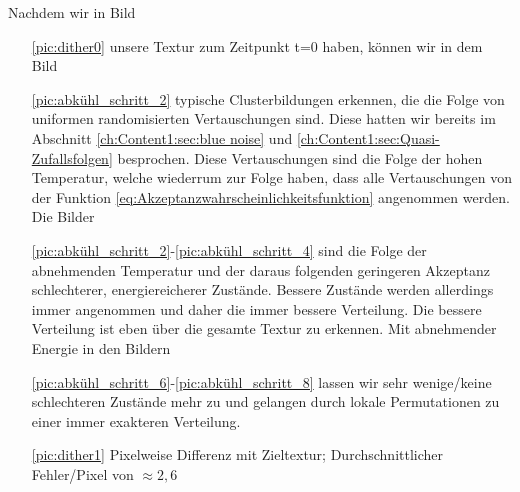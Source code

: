   Nachdem wir in Bild 
  \begin{itemize}
    \item[\ref{pic:dither0}] unsere  Textur zum Zeitpunkt t=0 
                              haben, können wir in dem Bild
    \item[\ref{pic:abkühl_schritt_2}] typische Clusterbildungen erkennen, die die Folge von 
                                    uniformen randomisierten Vertauschungen sind. Diese hatten wir bereits 
                                    im Abschnitt \ref{ch:Content1:sec:blue noise} und \ref{ch:Content1:sec:Quasi-Zufallsfolgen}
                                    besprochen. Diese Vertauschungen sind die Folge der hohen Temperatur, welche wiederrum zur Folge haben, 
                                    dass alle Vertauschungen von der Funktion \ref{eq:Akzeptanzwahrscheinlichkeitsfunktion} angenommen werden. 
                                    Die Bilder  
    \item[\ref{pic:abkühl_schritt_2}-\ref{pic:abkühl_schritt_4}] sind die Folge der abnehmenden Temperatur und der daraus folgenden geringeren 
                                    Akzeptanz schlechterer, energiereicherer Zustände. Bessere Zustände werden allerdings immer angenommen und 
                                    daher die immer bessere  Verteilung. Die bessere Verteilung ist eben über 
                                    die gesamte Textur zu erkennen. Mit abnehmender Energie in den Bildern   
    \item[\ref{pic:abkühl_schritt_6}-\ref{pic:abkühl_schritt_8}] lassen wir sehr wenige/keine schlechteren Zustände mehr zu und gelangen durch 
                                    lokale Permutationen zu einer immer exakteren Verteilung.  
    \item[\ref{pic:dither1}] Pixelweise Differenz mit Zieltextur; Durchschnittlicher Fehler/Pixel von $\approx 2,6$ 
  \end{itemize}





